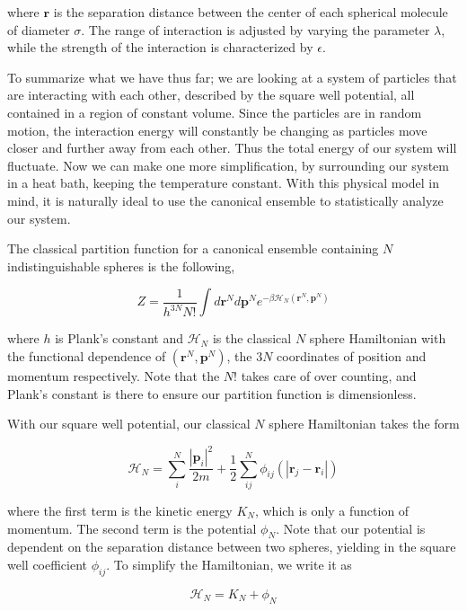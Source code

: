 where $\textbf{r}$ is the separation distance between the center of each spherical molecule of diameter $\sigma$.  The range of interaction is adjusted by varying the parameter $\lambda$, while the strength of the interaction is characterized by $\epsilon$. 

To summarize what we have thus far;  we are looking at a system of particles that are interacting with each other, described by the square well potential, all contained in a region of constant volume.  Since the particles are in random motion, the interaction energy will constantly be changing as particles move closer and further away from each other.  Thus the total energy of our system will fluctuate.  Now we can make one more simplification, by surrounding our system in a heat bath, keeping the temperature constant.  With this physical model in mind, it is naturally ideal to use the canonical ensemble to statistically analyze our system.  

The classical partition function for a canonical ensemble containing $N$ indistinguishable spheres is the following,

\begin{equation}
Z = \frac{1}{h^{3N} N!} \int d\textbf{r}^N d\textbf{p}^N e^{-\beta \mathcal{H}_N(\textbf{r}^N,\textbf{p}^N)}
\end{equation} 

where $h$ is Plank's constant and $\mathcal{H}_N$ is the classical $N$ sphere Hamiltonian with the functional dependence of  $(\textbf{r}^N,\textbf{p}^N)$, the $3N$ coordinates of position and momentum respectively.  Note that the $N!$ takes care of over counting, and Plank's constant is there to ensure our partition function is dimensionless.

With our square well potential, our classical $N$ sphere Hamiltonian takes the form

\begin{equation}
\mathcal{H}_N = \sum^{N}_{i}  \frac{| \textbf{p}_i|^2}{2m} + \frac{1}{2}  \sum^{N}_{ij} \phi_{ij} ( | \textbf{r}_j - \textbf{r}_i | ) 
\end{equation}

where the first term is the kinetic energy $K_N$, which is only a function of momentum.  The second term is the potential $\phi_N$.  Note that our potential is dependent on the separation distance between two spheres, yielding in the square well coefficient $\phi_{ij}$.  To simplify the Hamiltonian, we write it as

\begin{equation}
\mathcal{H}_N = K_N + \phi_N
\end{equation}

